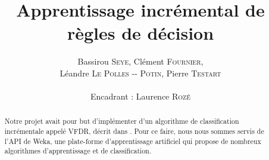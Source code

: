 \documentclass[a4paper,11pt]{article}
\title{ \textbf{Apprentissage incrémental de règles de décision} }
\author{Bassirou \textsc{Seye}, Clément \textsc{Fournier}, \\
        Léandre \textsc{Le Polles -{}- Potin}, Pierre \textsc{Testart} \\
        \\
        Encadrant : Laurence \textsc{Rozé}}
\date{}                    %
\begin{document}
          

    \maketitle                 %
    \thispagestyle{empty}      %

    \begin{abstract}
        Notre projet avait pour but d'implémenter d'un algorithme de classification incrémentale appelé VFDR, décrit dans \cite{Gama-VFDR}. Pour ce faire, nous nous sommes servis de l’API de Weka, une plate-forme d'apprentissage artificiel qui propose de nombreux algorithmes d'apprentissage et de classification. 
    \end{abstract} 

    
    
    

    \nocite{*}
    
\end{document}
